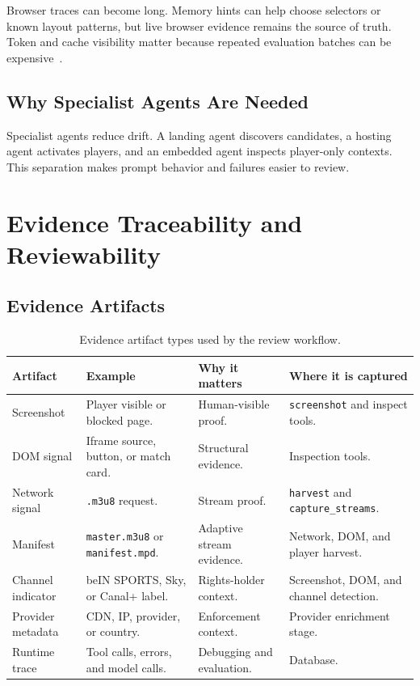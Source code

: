 Browser traces can become long. Memory hints can help choose selectors or
known layout patterns, but live browser evidence remains the source of truth.
Token and cache visibility matter because repeated evaluation batches can be
expensive~\cite{gemini-caching,gemini-pricing}.

\subsection{Why Specialist Agents Are Needed}

Specialist agents reduce drift. A landing agent discovers candidates, a hosting
agent activates players, and an embedded agent inspects player-only contexts.
This separation makes prompt behavior and failures easier to review.

\section{Evidence Traceability and Reviewability}

\subsection{Evidence Artifacts}

\begin{table}[!htbp]
\centering
\begin{tabularx}{\textwidth}{Q{2.7cm} Y Y Y}
\toprule
{}
Artifact & Example & Why it matters & Where it is captured \\
\midrule
Screenshot & Player visible or blocked page. & Human-visible proof. &
\texttt{screenshot} and inspect tools. \\
DOM signal & Iframe source, button, or match card. & Structural evidence. &
Inspection tools. \\
Network signal & \texttt{.m3u8} request. & Stream proof. & \texttt{harvest}
and \texttt{capture\_streams}. \\
Manifest & \texttt{master.m3u8} or \texttt{manifest.mpd}. & Adaptive stream
evidence. & Network, DOM, and player harvest. \\
Channel indicator & beIN SPORTS, Sky, or Canal+ label. & Rights-holder
context. & Screenshot, DOM, and channel detection. \\
Provider metadata & CDN, IP, provider, or country. & Enforcement context. &
Provider enrichment stage. \\
Runtime trace & Tool calls, errors, and model calls. & Debugging and
evaluation. & Database. \\
\bottomrule
\end{tabularx}
\caption{Evidence artifact types used by the review workflow.}
\label{tab:evidence-artifact-types}
\end{table}

